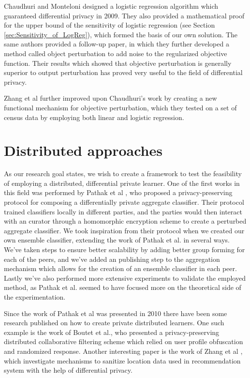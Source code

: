 Chaudhuri and Monteloni designed a logistic regression algorithm which guaranteed differential privacy in 2009. They also provided a mathematical proof for the upper bound of the sensitivity of logistic regression (see Section \ref{sec:Sensitivity_of_LogReg}), which formed the basis of our own solution. The same authors provided a follow-up paper\citep{chaudhuri2011riskMinimization}, in which they further developed a method called object perturbation to add noise to the regularized objective function. Their results which showed that objective perturbation is generally superior to output perturbation has proved very useful to the field of differential privacy. 

Zhang et al \citep{zhang2012functionMechanism} further improved upon Chaudhuri's work by creating a new functional mechanism for objective perturbation, which they tested on a set of census data by employing both linear and logistic regression. 

\section{Distributed approaches}
As our research goal states, we wish to create a framework to test the feasibility of employing a distributed, differential private learner. One of the first works in this field was performed by Pathak et al  \citep{pathak2010diffprivhomo}, who proposed a privacy-preserving protocol for composing a differentially private aggregate classifier. Their protocol trained classifiers locally in different parties, and the parties would then interact with an curator through a homomorphic encryption scheme to create a perturbed aggregate classifier. We took inspiration from their protocol when we created our own ensemble classifier, extending the work of Pathak et al. in several ways. We've taken steps to ensure better scalability by adding better group forming for each of the peers, and we've added an publishing step to the aggregation mechanism which allows for the creation of an ensemble classifier in each peer. Lastly we've also performed more extensive experiments to validate the employed method, as Pathak et al. seemed to have focused more on the theoretical side of the experimentation. 

Since the work of Pathak et al was presented in 2010 there have been some research published on how to create private distributed learners. One such example is the work of Boutet et al.\citep{boutet2013DisCollFil}, who presented a privacy-preserving distributed collaborative filtering scheme which relied on user profile obfuscation and randomized response. Another interesting paper is the work of Zhang et al \citep{zhang2014locationRecommendation}, which investigate mechanisms to sanitize location data used in recommendation system with the help of differential privacy. 

